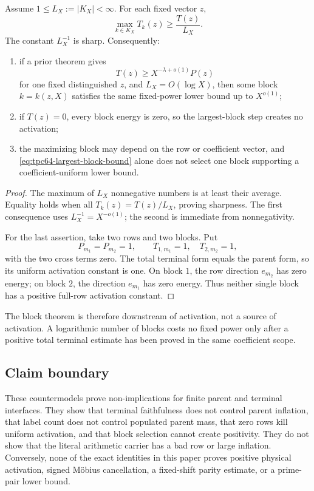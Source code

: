\begin{theorem}
\label{thm:tpc64-largest-block-after-positivity}
Assume \(1\le L_X:=|K_X|<\infty\).  For each fixed vector \(z\),
\begin{equation}
 \boxed{
 \max_{k\in K_X}T_k(z)\ge\frac{T(z)}{L_X}.}
 \label{eq:tpc64-largest-block-bound}
\end{equation}
The constant \(L_X^{-1}\) is sharp.  Consequently:
\begin{enumerate}[label=\textup{(\roman*)},leftmargin=3em]
 \item if a prior theorem gives
       \[
        T(z)\ge X^{-\lambda+o(1)}P(z)
       \]
       for one fixed distinguished \(z\), and
       \(L_X=O(\log X)\), then some block \(k=k(z,X)\) satisfies the same
       fixed-power lower bound up to \(X^{o(1)}\);
 \item if \(T(z)=0\), every block energy is zero, so the largest-block
       step creates no activation;
 \item the maximizing block may depend on the row or coefficient vector,
       and \eqref{eq:tpc64-largest-block-bound} alone does not select one
       block supporting a coefficient-uniform lower bound.
\end{enumerate}
\end{theorem}

\begin{proof}
The maximum of \(L_X\) nonnegative numbers is at least their average.
Equality holds when all \(T_k(z)=T(z)/L_X\), proving sharpness.  The first
consequence uses \(L_X^{-1}=X^{-o(1)}\); the second is immediate from
nonnegativity.

For the last assertion, take two rows and two blocks.  Put
\[
 P_{m_1}=P_{m_2}=1,\qquad
 T_{1,m_1}=1,\quad T_{2,m_2}=1,
\]
with the two cross terms zero.  The total terminal form equals the parent
form, so its uniform activation constant is one.  On block \(1\), the row
direction \(e_{m_2}\) has zero energy; on block \(2\), the direction
\(e_{m_1}\) has zero energy.  Thus neither single block has a positive
full-row activation constant.
\end{proof}

The block theorem is therefore downstream of activation, not a source of
activation.  A logarithmic number of blocks costs no fixed power only
after a positive total terminal estimate has been proved in the same
coefficient scope.

\subsection{Claim boundary}

These countermodels prove non-implications for finite parent and terminal
interfaces.  They show that terminal faithfulness does not control parent
inflation, that label count does not control populated parent mass, that
zero rows kill uniform activation, and that block selection cannot create
positivity.  They do not show that the literal arithmetic carrier has a
bad row or large inflation.  Conversely, none of the exact identities in
this paper proves positive physical activation, signed M\"obius
cancellation, a fixed-shift parity estimate, or a prime-pair lower bound.
